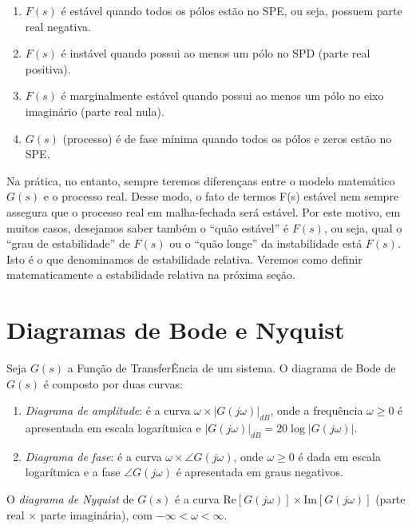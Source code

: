 \documentclass[
]{book}
\providecommand{\tightlist}{%
  \setlength{\itemsep}{0pt}\setlength{\parskip}{0pt}}
\theoremstyle{definition}
\theoremstyle{definition}
\theoremstyle{definition}
\theoremstyle{remark}
\begin{document}
\begin{enumerate}
\def\labelenumi{\arabic{enumi}.}
\tightlist
\item
  \(F(s)\) é estável quando todos os pólos estão no SPE, ou seja, possuem parte real negativa.
\item
  \(F(s)\) é instável quando possui ao menos um pólo no SPD (parte real positiva).
\item
  \(F(s)\) é marginalmente estável quando possui ao menos um pólo no eixo imaginário (parte real nula).
\item
  \(G(s)\) (processo) é de fase mínima quando todos os pólos e zeros estão no SPE.
\end{enumerate}

Na prática, no entanto, sempre teremos diferençaas entre o modelo matemático \(G(s)\) e o processo real. Desse modo, o fato de termos F(s) estável nem sempre assegura que o processo real em malha-fechada será estável. Por este motivo, em muitos casos, desejamos saber também o ``quão estável'' é \(F(s)\), ou seja, qual o ``grau de estabilidade'' de \(F(s)\) ou o ``quão longe'' da instabilidade está \(F(s)\). Isto é o que denominamos de estabilidade relativa.
Veremos como definir matematicamente a estabilidade relativa na próxima seção.

\hypertarget{diagramas-de-bode-e-nyquist}{%
\section{Diagramas de Bode e Nyquist}\label{diagramas-de-bode-e-nyquist}}

Seja \(G(s)\) a Função de TransferÊncia de um sistema. O diagrama de Bode de \(G(s)\) é composto por duas curvas:

\begin{enumerate}
\def\labelenumi{\arabic{enumi}.}
\tightlist
\item
  \emph{Diagrama de amplitude}: é a curva \(\omega \times |G(j\omega)|_{dB}\), onde a frequência \(\omega \geq 0\) é apresentada em escala logarítmica e \(|G(j\omega)|_{dB} = 20 \log |G(j\omega)|\).
\item
  \emph{Diagrama de fase}: é a curva \(\omega \times\angle{G(j\omega)}\), onde \(\omega \geq 0\) é dada em escala logarítmica e a fase \(\angle{G(j\omega)}\) é apresentada em graus negativos.
\end{enumerate}

O \emph{diagrama de Nyquist} de \(G(s)\) é a curva \(\text{Re}[G(j\omega)] \times \text{Im}[G(j\omega)]\) (parte real \(\times\) parte imaginária), com \(-\infty < \omega < \infty\).
\end{document}
